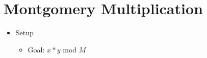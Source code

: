 \section{Montgomery Multiplication}
\begin{itemize}
\item Setup
    \begin{itemize}
    \item Goal: $x*y$ mod $M$ 
    \end{itemize}
\end{itemize}